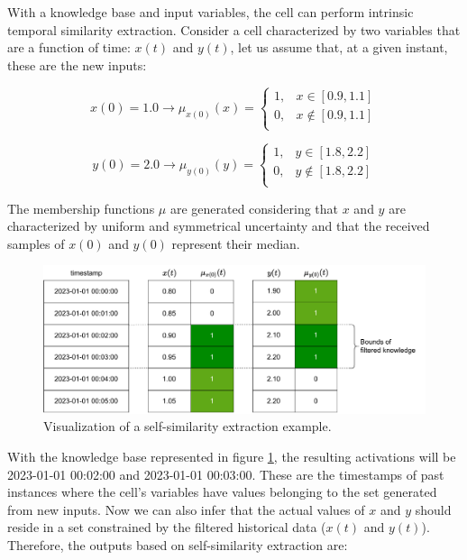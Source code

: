 With a knowledge base and input variables, the cell can perform intrinsic temporal similarity extraction.
Consider a cell characterized by two variables that are a function of time: $x(t)$ and $y(t)$,
let us assume that, at a given instant, these are the new inputs:

\begin{equation}
    x(0) = 1.0 \rightarrow \mu_{x(0)}(x) =
    \begin{cases}
        1, & x \in [0.9, 1.1]    \\
        0, & x \notin [0.9, 1.1] \\
    \end{cases}
\end{equation}

\begin{equation}
    y(0) = 2.0 \rightarrow \mu_{y(0)}(y) =
    \begin{cases}
        1, & y \in [1.8, 2.2]    \\
        0, & y \notin [1.8, 2.2] \\
    \end{cases}
\end{equation}

The membership functions $\mu$ are generated considering that $x$ and $y$ are characterized by uniform and symmetrical uncertainty and that the received samples of $x(0)$ and $y(0)$ represent their median.

\begin{figure}[h!]
    \centering
    \includegraphics[width=\linewidth]{figures/chapter4/cell/solo_state_estimation.pdf}
    \caption{Visualization of a self-similarity extraction example.}
    \label{fig:solo_state_estimation}
\end{figure}


With the knowledge base represented in figure \ref{fig:solo_state_estimation}, the resulting activations will be 2023-01-01 00:02:00 and 2023-01-01 00:03:00. These are the timestamps of past instances where the cell's variables have values belonging to the set generated from new inputs. Now we can also infer that the actual values of $x$ and $y$ should reside in a set constrained by the filtered historical data ($x(t)$ and $y(t)$). Therefore, the outputs based on self-similarity extraction are:

